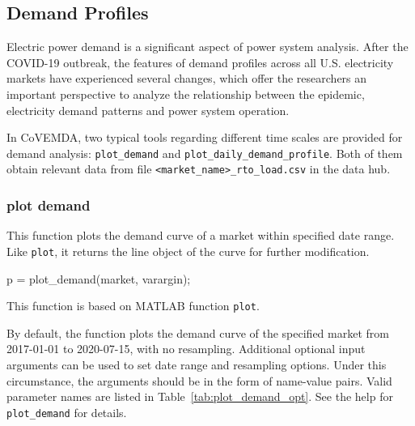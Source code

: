 \documentclass[11pt]{article}
\newcommand{\covemda}{CoVEMDA}
\newcommand{\matlab}{\textsc{MATLAB}}
\numberwithin{equation}{section}
\numberwithin{table}{section}
\numberwithin{figure}{section}
\begin{document}
\subsection{Demand Profiles}

Electric power demand is a significant aspect of power system analysis. After the COVID-19 outbreak, the features of demand profiles across all U.S. electricity markets have experienced several changes, which offer the researchers an important perspective to analyze the relationship between the epidemic, electricity demand patterns and power system operation.

In \covemda{}, two typical tools regarding different time scales are provided for demand analysis: \verb!plot_demand! and \verb!plot_daily_demand_profile!. Both of them obtain relevant data from file \verb!<market_name>_rto_load.csv! in the data hub.

\subsubsection{plot demand}

This function plots the demand curve of a market within specified date range. Like \verb!plot!, it returns the line object of the curve for further modification.

\begin{Code}
  p = plot_demand(market, varargin);
\end{Code}

This function is based on \matlab{} function \verb!plot!.

By default, the function plots the demand curve of the specified market from 2017-01-01 to 2020-07-15, with no resampling. Additional optional input arguments can be used to set date range and resampling options. Under this circumstance, the arguments should be in the form of name-value pairs. Valid parameter names are listed in Table~\ref{tab:plot_demand_opt}. See the help for \verb!plot_demand! for details.
\end{document}
